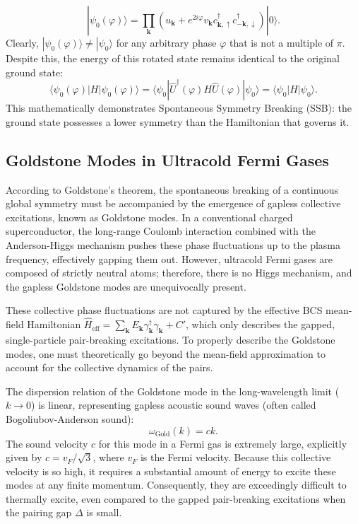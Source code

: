 \[
    |\psi_0(\varphi)\rangle = \prod_{\mathbf{k}} \left( u_{\mathbf{k}} + e^{2i\varphi} v_{\mathbf{k}} c_{\mathbf{k},\uparrow}^\dagger c_{-\mathbf{k},\downarrow}^\dagger \right) |0\rangle.
\]
Clearly, \( |\psi_0(\varphi)\rangle \neq |\psi_0\rangle \) for any arbitrary phase \( \varphi \) that is not a multiple of \( \pi \). Despite this, the energy of this rotated state remains identical to the original ground state:
\[
    \langle \psi_0(\varphi) | H | \psi_0(\varphi) \rangle = \langle \psi_0 | \hat{U}^\dagger(\varphi) H \hat{U}(\varphi) | \psi_0 \rangle = \langle \psi_0 | H | \psi_0 \rangle.
\]
This mathematically demonstrates Spontaneous Symmetry Breaking (SSB): the ground state possesses a lower symmetry than the Hamiltonian that governs it.

\subsection{Goldstone Modes in Ultracold Fermi Gases}

According to Goldstone's theorem, the spontaneous breaking of a continuous global symmetry must be accompanied by the emergence of gapless collective excitations, known as Goldstone modes. In a conventional charged superconductor, the long-range Coulomb interaction combined with the Anderson-Higgs mechanism pushes these phase fluctuations up to the plasma frequency, effectively gapping them out. However, ultracold Fermi gases are composed of strictly neutral atoms; therefore, there is no Higgs mechanism, and the gapless Goldstone modes are unequivocally present.

These collective phase fluctuations are not captured by the effective BCS mean-field Hamiltonian \( \hat{H}_{\text{eff}} = \sum_{\mathbf{k}} E_{\mathbf{k}} \gamma_{\mathbf{k}}^\dagger \gamma_{\mathbf{k}} + C' \), which only describes the gapped, single-particle pair-breaking excitations. To properly describe the Goldstone modes, one must theoretically go beyond the mean-field approximation to account for the collective dynamics of the pairs.

The dispersion relation of the Goldstone mode in the long-wavelength limit (\( k \to 0 \)) is linear, representing gapless acoustic sound waves (often called Bogoliubov-Anderson sound):
\[
    \omega_{\text{Gold}}(k) = c k.
\]
The sound velocity \( c \) for this mode in a Fermi gas is extremely large, explicitly given by \( c = v_F / \sqrt{3} \), where \( v_F \) is the Fermi velocity. Because this collective velocity is so high, it requires a substantial amount of energy to excite these modes at any finite momentum. Consequently, they are exceedingly difficult to thermally excite, even compared to the gapped pair-breaking excitations when the pairing gap \( \Delta \) is small.

